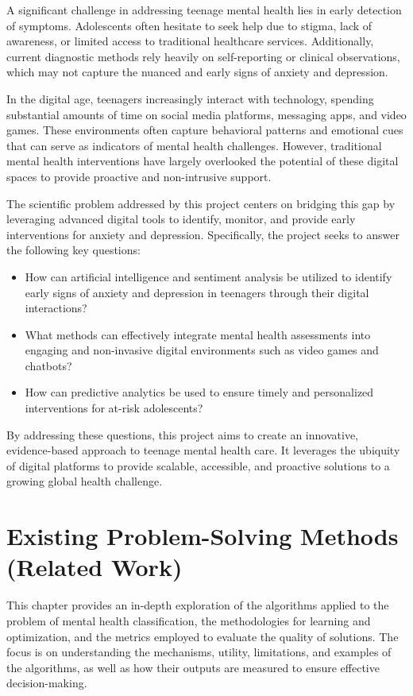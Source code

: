 \documentclass[runningheads,a4paper,11pt]{report}
\begin{document}
A significant challenge in addressing teenage mental health lies in early detection of symptoms. Adolescents often hesitate to seek help due to stigma, lack of awareness, or limited access to traditional healthcare services. Additionally, current diagnostic methods rely heavily on self-reporting or clinical observations, which may not capture the nuanced and early signs of anxiety and depression.

In the digital age, teenagers increasingly interact with technology, spending substantial amounts of time on social media platforms, messaging apps, and video games. These environments often capture behavioral patterns and emotional cues that can serve as indicators of mental health challenges. However, traditional mental health interventions have largely overlooked the potential of these digital spaces to provide proactive and non-intrusive support.

The scientific problem addressed by this project centers on bridging this gap by leveraging advanced digital tools to identify, monitor, and provide early interventions for anxiety and depression. Specifically, the project seeks to answer the following key questions:
\begin{itemize}
    \item How can artificial intelligence and sentiment analysis be utilized to identify early signs of anxiety and depression in teenagers through their digital interactions?
    \item What methods can effectively integrate mental health assessments into engaging and non-invasive digital environments such as video games and chatbots?
    \item How can predictive analytics be used to ensure timely and personalized interventions for at-risk adolescents?
\end{itemize}

By addressing these questions, this project aims to create an innovative, evidence-based approach to teenage mental health care. It leverages the ubiquity of digital platforms to provide scalable, accessible, and proactive solutions to a growing global health challenge.


\chapter{Existing Problem-Solving Methods (Related Work)}
\label{chapter:existing-problem}
This chapter provides an in-depth exploration of the algorithms applied to the problem of mental health classification, the methodologies for learning and optimization, and the metrics employed to evaluate the quality of solutions. The focus is on understanding the mechanisms, utility, limitations, and examples of the algorithms, as well as how their outputs are measured to ensure effective decision-making.
\end{document}
